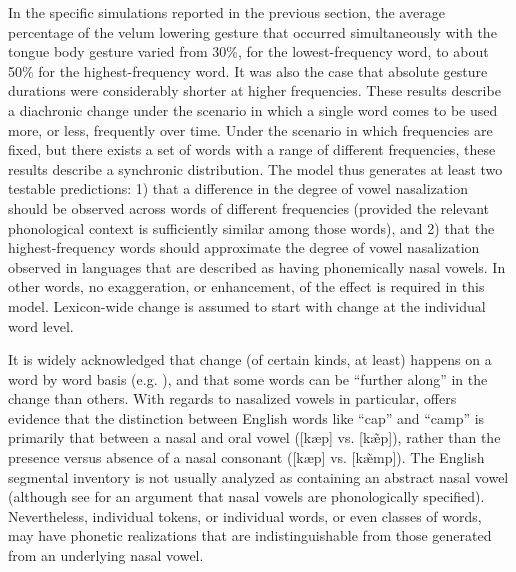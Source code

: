 In the specific simulations reported in the previous section, the
average percentage of the velum lowering gesture that occurred simultaneously
with the tongue body gesture varied from 30\%, for the lowest-frequency
word, to about 50\% for the highest-frequency word. It was also the
case that absolute gesture durations were considerably shorter
at higher frequencies. These results describe a diachronic change
under the scenario in which a single word comes to be used more, or
less, frequently over time. Under the scenario in which frequencies
are fixed, but there exists a set of words with a range of different
frequencies, these results describe a synchronic distribution. The
model thus generates at least two testable predictions: 1) that a
difference in the degree of vowel nasalization should be observed
across words of different frequencies (provided the relevant phonological
context is sufficiently similar among those words), and 2) that the
highest-frequency words should approximate the degree of vowel nasalization
observed in languages that are described as having phonemically nasal
vowels. In other words, no exaggeration, or enhancement, of the effect
is required in this model. Lexicon-wide change is assumed to start
with change at the individual word level.

It is widely acknowledged that change (of certain kinds, at least)
happens on a word by word basis (e.g. \citealt{Phillips1984,Bybee2002,Pierrehumbert2002}),
and that some words can be ``further along'' in the change than others.
With regards to nasalized vowels in particular, \citet{malecot1960vowel}
offers evidence that the distinction between English words like “cap”
and “camp” is primarily that between a nasal and oral vowel
({[kæp]} vs. {[kæ̃p]}), rather than the presence
versus absence of a nasal consonant ({[kæp]} vs. {[kæ̃mp]}).
The English segmental inventory is not usually analyzed as containing
an abstract nasal vowel (although see \citealt{Sole1992} for an argument
that nasal vowels are phonologically specified). Nevertheless, individual
tokens, or individual words, or even classes of words, may have phonetic
realizations that are indistinguishable from those generated from
an underlying nasal vowel. 
